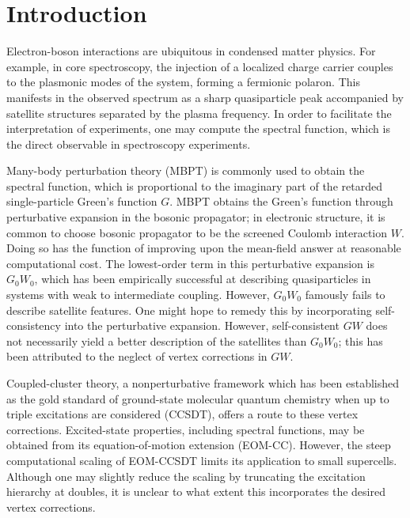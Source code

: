 \documentclass[%
 reprint,
 amsmath,amssymb,
 aps,
]{revtex4-2}
\begin{document}
\maketitle

\section{Introduction}
\label{sec:intro}
Electron-boson interactions are ubiquitous in condensed matter physics. For example, in core spectroscopy, the injection of a localized charge carrier couples to the plasmonic modes of the system, forming a fermionic polaron. This manifests in the observed spectrum as a sharp quasiparticle peak accompanied by satellite structures separated by the plasma frequency. In order to facilitate the interpretation of experiments, one may compute the spectral function, which is the direct observable in spectroscopy experiments.

Many-body perturbation theory (MBPT) is commonly used to obtain the spectral function, which is proportional to the imaginary part of the retarded single-particle Green's function $G$. MBPT obtains the Green's function through perturbative expansion in the bosonic propagator; in electronic structure, it is common to choose bosonic propagator to be the screened Coulomb interaction $W$. Doing so has the function of improving upon the mean-field answer at reasonable computational cost. The lowest-order term in this perturbative expansion is $G_0W_0$, which has been empirically successful at describing quasiparticles in systems with weak to intermediate coupling. However, $G_0W_0$ famously fails to describe satellite features. One might hope to remedy this by incorporating self-consistency into the perturbative expansion. However, self-consistent $GW$ does not necessarily yield a better description of the satellites than $G_0W_0$; this has been attributed to the neglect of vertex corrections in $GW$.

Coupled-cluster theory, a nonperturbative framework which has been established as the gold standard of ground-state molecular quantum chemistry when up to triple excitations are considered (CCSDT), offers a route to these vertex corrections. Excited-state properties, including spectral functions, may be obtained from its equation-of-motion extension (EOM-CC). However, the steep computational scaling of EOM-CCSDT limits its application to small supercells. Although one may slightly reduce the scaling by truncating the excitation hierarchy at doubles, it is unclear to what extent this incorporates the desired vertex corrections.
\end{document}
